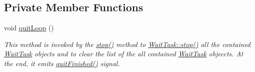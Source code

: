 \subsection*{Private Member Functions}
\begin{DoxyCompactItemize}
\item 
\hypertarget{class_wait_worker_a52b9f53cccaa737e7de6d978c96ff9ab}{}void \hyperlink{class_wait_worker_a52b9f53cccaa737e7de6d978c96ff9ab}{quit\+Loop} ()\label{class_wait_worker_a52b9f53cccaa737e7de6d978c96ff9ab}

\begin{DoxyCompactList}\small\item\em This method is invoked by the \hyperlink{class_wait_worker_af01864effa7662c8261128ff12fb922d}{stop()} method to \hyperlink{class_wait_task_a6bbc82bd62e9fc2cad789a24a6ab928a}{Wait\+Task\+::stop()} all the contained \hyperlink{class_wait_task}{Wait\+Task} objects and to clear the list of the all contained \hyperlink{class_wait_task}{Wait\+Task} objeccts. At the end, it emits \hyperlink{class_wait_worker_a5f65bc5e4691e9542afef8df55bf27be}{quit\+Finished()} signal. \end{DoxyCompactList}\end{DoxyCompactItemize}

